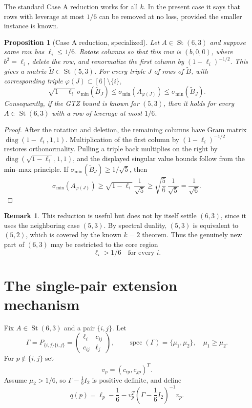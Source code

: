 \documentclass[11pt]{article}
\numberwithin{equation}{section}
\newtheorem{proposition}[theorem]{Proposition}
\theoremstyle{definition}
\newtheorem{remark}[theorem]{Remark}
\newcommand{\St}{\operatorname{St}}
\newcommand{\diag}{\operatorname{diag}}
\newcommand{\spec}{\operatorname{spec}}
\newcommand{\smin}{\sigma_{\min}}
\begin{document}
The standard Case A reduction works for all $k$.  In the present case it says
that rows with leverage at most $1/6$ can be removed at no loss, provided the
smaller instance is known.

\begin{proposition}[Case A reduction, specialized]\label{prop:caseA}
Let $A\in\St(6,3)$ and suppose some row has $\ell_i\le 1/6$.  Rotate columns so
that this row is $(b,0,0)$, where $b^2=\ell_i$, delete the row, and renormalize
the first column by $(1-\ell_i)^{-1/2}$.  This gives a matrix
$\widetilde B\in\St(5,3)$.  For every triple $J$ of rows of $\widetilde B$,
with corresponding triple $\varphi(J)\subset[6]\setminus\{i\}$,
\[
  \sqrt{1-\ell_i}\,\smin(\widetilde B_J)
  \le \smin(A_{\varphi(J)})
  \le \smin(\widetilde B_J).
\]
Consequently, if the GTZ bound is known for $(5,3)$, then it holds for every
$A\in\St(6,3)$ with a row of leverage at most $1/6$.
\end{proposition}

\begin{proof}
After the rotation and deletion, the remaining columns have Gram matrix
$\diag(1-\ell_i,1,1)$.  Multiplication of the first column by
$(1-\ell_i)^{-1/2}$ restores orthonormality.  Pulling a triple back multiplies
on the right by $\diag(\sqrt{1-\ell_i},1,1)$, and the displayed singular value
bounds follow from the min--max principle.  If
$\smin(\widetilde B_J)\ge 1/\sqrt5$, then
\[
  \smin(A_{\varphi(J)})
  \ge \sqrt{1-\ell_i}\,\frac1{\sqrt5}
  \ge \sqrt{\frac56}\,\frac1{\sqrt5}
  =\frac1{\sqrt6}.
\]
\end{proof}

\begin{remark}
This reduction is useful but does not by itself settle $(6,3)$, since it uses
the neighboring case $(5,3)$.  By spectral duality, $(5,3)$ is equivalent to
$(5,2)$, which is covered by the known $k=2$ theorem.  Thus the genuinely new
part of $(6,3)$ may be restricted to the core region
\[
  \ell_i>1/6\quad\text{for every }i.
\]
\end{remark}

\section{The single-pair extension mechanism}

Fix $A\in\St(6,3)$ and a pair $\{i,j\}$.  Let
\[
  \Gamma=P_{\{i,j\}\{i,j\}}
  =
  \begin{pmatrix}
    \ell_i & c_{ij}\\
    c_{ij} & \ell_j
  \end{pmatrix},
  \qquad
  \spec(\Gamma)=\{\mu_1,\mu_2\},\quad \mu_1\ge\mu_2.
\]
For $p\notin\{i,j\}$ set
\[
  v_p=(c_{ip},c_{jp})^T.
\]
Assume $\mu_2>1/6$, so $\Gamma-\frac16 I_2$ is positive definite, and define
\[
  q(p)=\ell_p-\frac16
  -v_p^T\left(\Gamma-\frac16 I_2\right)^{-1}v_p.
\]
\end{document}
